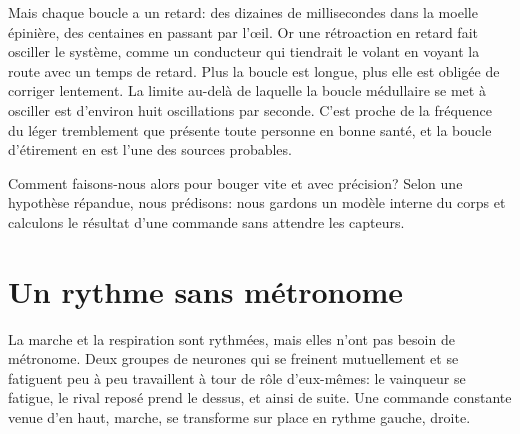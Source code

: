 Mais chaque boucle a un retard: des dizaines de millisecondes dans la moelle épinière, des centaines en passant par l'œil. Or une rétroaction en retard fait osciller le système, comme un conducteur qui tiendrait le volant en voyant la route avec un temps de retard. Plus la boucle est longue, plus elle est obligée de corriger lentement. La limite au-delà de laquelle la boucle médullaire se met à osciller est d'environ huit oscillations par seconde. C'est proche de la fréquence du léger tremblement que présente toute personne en bonne santé, et la boucle d'étirement en est l'une des sources probables.

Comment faisons-nous alors pour bouger vite et avec précision? Selon une hypothèse répandue, nous prédisons: nous gardons un modèle interne du corps et calculons le résultat d'une commande sans attendre les capteurs.

\section*{Un rythme sans métronome}

La marche et la respiration sont rythmées, mais elles n'ont pas besoin de métronome. Deux groupes de neurones qui se freinent mutuellement et se fatiguent peu à peu travaillent à tour de rôle d'eux-mêmes: le vainqueur se fatigue, le rival reposé prend le dessus, et ainsi de suite. Une commande constante venue d'en haut, \og marche\fg{}, se transforme sur place en rythme \og gauche, droite\fg{}.

